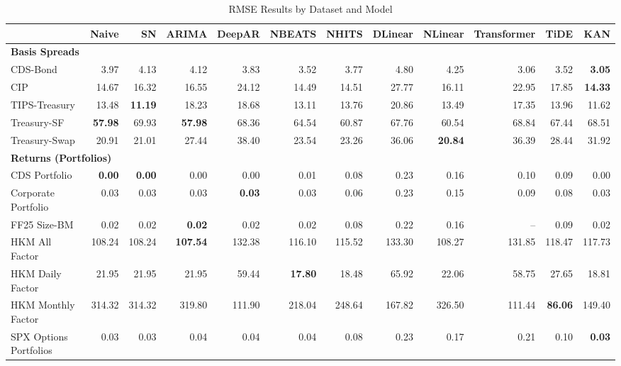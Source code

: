 
\begin{table}[htbp]
\centering
\caption{RMSE Results by Dataset and Model}
\label{tab:rmse_results}
\scriptsize
\setlength{\tabcolsep}{1.5pt}
\renewcommand{\arraystretch}{0.9}
\begin{tabular}{@{}lrrrrrrrrrrr@{}}
\toprule
 & Naive & SN & ARIMA & DeepAR & NBEATS & NHITS & DLinear & NLinear & Transformer & TiDE & KAN \\
\midrule
\multicolumn{12}{l}{\textbf{Basis Spreads}} \\
CDS-Bond & 3.97 & 4.13 & 4.12 & 3.83 & 3.52 & 3.77 & 4.80 & 4.25 & 3.06 & 3.52 & \textbf{3.05} \\
CIP & 14.67 & 16.32 & 16.55 & 24.12 & 14.49 & 14.51 & 27.77 & 16.11 & 22.95 & 17.85 & \textbf{14.33} \\
TIPS-Treasury & 13.48 & \textbf{11.19} & 18.23 & 18.68 & 13.11 & 13.76 & 20.86 & 13.49 & 17.35 & 13.96 & 11.62 \\
Treasury-SF & \textbf{57.98} & 69.93 & \textbf{57.98} & 68.36 & 64.54 & 60.87 & 67.76 & 60.54 & 68.84 & 67.44 & 68.51 \\
Treasury-Swap & 20.91 & 21.01 & 27.44 & 38.40 & 23.54 & 23.26 & 36.06 & \textbf{20.84} & 36.39 & 28.44 & 31.92 \\
\midrule
\multicolumn{12}{l}{\textbf{Returns (Portfolios)}} \\
CDS Portfolio & \textbf{0.00} & \textbf{0.00} & 0.00 & 0.00 & 0.01 & 0.08 & 0.23 & 0.16 & 0.10 & 0.09 & 0.00 \\
Corporate Portfolio & 0.03 & 0.03 & 0.03 & \textbf{0.03} & 0.03 & 0.06 & 0.23 & 0.15 & 0.09 & 0.08 & 0.03 \\
FF25 Size-BM & 0.02 & 0.02 & \textbf{0.02} & 0.02 & 0.02 & 0.08 & 0.22 & 0.16 & -- & 0.09 & 0.02 \\
HKM All Factor & 108.24 & 108.24 & \textbf{107.54} & 132.38 & 116.10 & 115.52 & 133.30 & 108.27 & 131.85 & 118.47 & 117.73 \\
HKM Daily Factor & 21.95 & 21.95 & 21.95 & 59.44 & \textbf{17.80} & 18.48 & 65.92 & 22.06 & 58.75 & 27.65 & 18.81 \\
HKM Monthly Factor & 314.32 & 314.32 & 319.80 & 111.90 & 218.04 & 248.64 & 167.82 & 326.50 & 111.44 & \textbf{86.06} & 149.40 \\
SPX Options Portfolios & 0.03 & 0.03 & 0.04 & 0.04 & 0.04 & 0.08 & 0.23 & 0.17 & 0.21 & 0.10 & \textbf{0.03} \\

\end{tabular}
\end{table}

